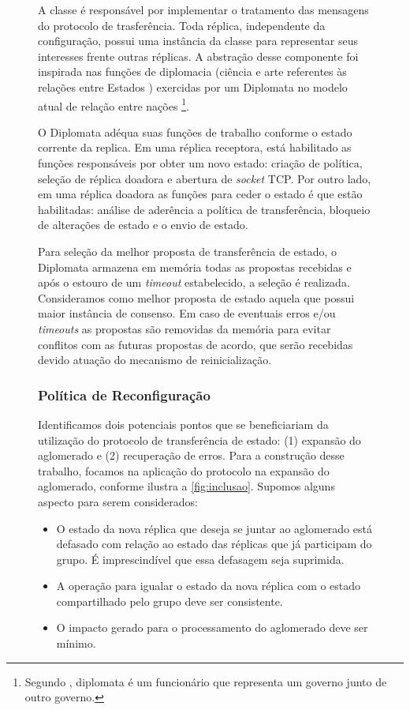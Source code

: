 \begin{figure}[ht]

A classe  é responsável por implementar o tratamento das mensagens do
protocolo de trasferência. Toda réplica, independente da configuração, possui uma
instância da classe  para representar seus interesses frente outras
réplicas. A abstração desse componente foi inspirada nas funções de diplomacia (ciência e
arte referentes às relações entre Estados \cite{aurelio}) exercidas por um Diplomata no
modelo atual de relação entre nações \footnote{Segundo , diplomata é
um funcionário que representa um governo junto de outro governo.}.

O Diplomata adéqua suas funções de trabalho conforme o estado corrente da replica. Em uma
réplica receptora, está habilitado as funções responsáveis por obter um novo estado:
criação de política, seleção de réplica doadora e abertura de \emph{socket} TCP. Por outro
lado, em uma réplica doadora as funções para ceder o estado é que estão habilitadas:
análise de aderência a política de transferência, bloqueio de alterações de estado e o
envio de estado.

Para seleção da melhor proposta de transferência de estado, o Diplomata armazena em
memória todas as propostas recebidas e após o estouro de um \emph{timeout} estabelecido, a
seleção é realizada. Consideramos como melhor proposta de estado aquela que possui maior
instância de consenso. Em caso de eventuais erros e/ou \emph{timeouts} as propostas são
removidas da memória para evitar conflitos com as futuras propostas de acordo, que serão
recebidas devido atuação do mecanismo de reinicialização.

\subsubsection{Política de Reconfiguração}

Identificamos dois potenciais pontos que se beneficiariam da utilização do protocolo de
transferência de estado: (1) expansão do aglomerado e (2) recuperação de erros. Para a
construção desse trabalho, focamos na aplicação do protocolo na expansão do aglomerado,
conforme ilustra a \autoref{fig:inclusao}. Supomos alguns aspecto para serem considerados:

\begin{itemize}
  \item O estado da nova réplica que deseja se juntar ao aglomerado está defasado com
    relação ao estado das réplicas que já participam do grupo. É imprescindível que essa
    defasagem seja suprimida.
  \item A operação para igualar o estado da nova réplica com o estado compartilhado pelo
    grupo deve ser consistente.
  \item O impacto gerado para o processamento do aglomerado deve ser mínimo.
\end{itemize}


\end{figure}
